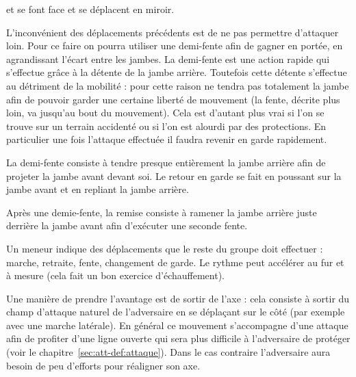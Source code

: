 \begin{exercice}
\label{ex:general:miroir}

\A et \D se font face et se déplacent en miroir.
\end{exercice}


L'inconvénient des déplacements précédents est de ne pas permettre d'attaquer loin.
Pour ce faire on pourra utiliser une demi-fente afin de gagner en portée, en agrandissant l'écart entre les jambes.
La demi-fente est une action rapide qui s'effectue grâce à la détente de la jambe arrière.
Toutefois cette détente s'effectue au détriment de la mobilité : pour cette raison ne tendra pas totalement la jambe afin de pouvoir garder une certaine liberté de mouvement (la fente, décrite plus loin, va jusqu'au bout du mouvement).
Cela est d'autant plus vrai si l'on se trouve sur un terrain accidenté ou si l'on est alourdi par des protections.
En particulier une fois l'attaque effectuée il faudra revenir en garde rapidement.

\begin{definition}
\label{dep:def:demi-fente}

La demi-fente consiste à tendre presque entièrement la jambe arrière afin de projeter la jambe avant devant soi.
Le retour en garde se fait en poussant sur la jambe avant et en repliant la jambe arrière.
\end{definition}


\begin{definition}

Après une demie-fente, la remise consiste à ramener la jambe arrière juste derrière la jambe avant afin d'exécuter une seconde fente.
\end{definition}


\begin{exercice}

Un meneur indique des déplacements que le reste du groupe doit effectuer : marche, retraite, fente, changement de garde.
Le rythme peut accélérer au fur et à mesure (cela fait un bon exercice d'échauffement).
\end{exercice}


Une manière de prendre l'avantage est de sortir de l'axe : cela consiste à sortir du champ d'attaque naturel de l'adversaire en se déplaçant sur le côté (par exemple avec une marche latérale).
En général ce mouvement s'accompagne d'une attaque afin de profiter d'une ligne ouverte qui sera plus difficile à l'adversaire de protéger (voir le chapitre~\ref{sec:att-def:attaque}).
Dans le cas contraire l'adversaire aura besoin de peu d'efforts pour réaligner son axe.


